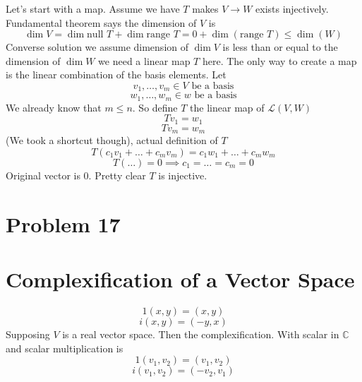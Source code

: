 \documentclass[letter]{article}
\begin{document}
Let's start with a map. Assume we have $T$ makes $V\to W$ exists injectively. Fundamental theorem says the dimension of $V$ is 
\[
\dim V = \dim \text{null } T + \dim \text{range }T = 0 + \dim (\text{range } T) \le \dim (W)
\]
Converse solution we assume dimension of $\dim V$ is less than or equal to the dimension of $\dim W$ we need a linear map $T$ here. The only way to create a map is the linear combination of the basis elements. Let 
\[
v_1 ,\ldots, v_m \in  V \text{ be a basis}
\] 
\[
w_1 ,\ldots, w_m \in  w \text{ be a basis}
\] 
We already know that $m \le n$. So define $T$ the linear map of $\mathcal L (V, W)$ 
\[
Tv_1 = w_1
\] 
\[
T v_m = w_m
\] 
(We took a shortcut though), actual definition of $T$ 
\[
T ( c_1 v_1 + \ldots + c_m v_m) = c_1 w_1 + \ldots + c_m w_m 
\]
\[
T (\ldots) = 0 \implies c_1 = \ldots = c_m = 0
\]
Original vector is $0 $. 
Pretty clear $T$ is injective.  

\section*{Problem 17} 

\section*{Complexification of a Vector Space} 
\[
1(x,y) = (x,y)
\] 
\[
i (x,y) = (-y, x)
\]
Supposing $V$ is a real vector space. Then the complexification. With scalar in $\mathbb{C}$ and scalar multiplication is 
\[
1 (v_1, v_2) = (v_1, v_2)
\] 
\[
i (v_1, v_2) = (-v_2, v_1)
\] 
\end{document}
